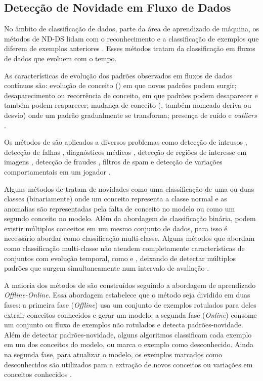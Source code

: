 \subsection{Detecção de Novidade em Fluxo de Dados}

No âmbito de classificação de dados, parte da área de aprendizado de máquina, os
métodos de \acf{ND-DS} lidam com o reconhecimento e a classificação de exemplos
que diferem de exemplos anteriores \cite{Markou2003,Perner2009,Gama2010}.
Esses métodos tratam da classificação em fluxos de dados que evoluem com o tempo.

As características de evolução dos padrões observados em fluxos de dados contínuos são: 
evolução de conceito (\evolution) em que novos padrões podem surgir;
desaparecimento ou recorrência de conceito, em que padrões podem desaparecer e
também podem reaparecer;
mudança de conceito (\drift, também nomeado deriva ou desvio) onde um padrão
gradualmente se transforma;
presença de ruído e \emph{outliers} \cite{Gama2010}.

Os métodos de \nd são aplicados a diversos problemas como
detecção de intrusos \cite{Coull2003,Spinosa2008,Viegas2019,Cassales2019a},
detecção de falhas \cite{Zhang2006},
diagnósticos médicos \cite{Perner2009},
detecção de regiões de interesse em imagens \cite{singh2004approach},
detecção de fraudes \cite{wang2003mining,Abdallah201690}, 
filtros de spam \cite{Hayat2010dct} e
detecção de variações comportamentais em um jogador \cite{Vallim20136258}.

Alguns métodos de \nd tratam de novidades como uma classificação de uma
ou duas classes (binariamente) onde um conceito representa a classe normal e as anomalias
são representadas pela falta de conceito no modelo ou como um segundo conceito
no modelo.
Além da abordagem de classificação binária, podem existir múltiplos conceitos em um mesmo
conjunto de dados, para isso é necessário abordar \nd como classificação
multi-classe.
Alguns métodos que abordam \nd como classificação multi-classe não
atendem completamente características de conjuntos com 
evolução temporal,
como \evolution e \drift, deixando de detectar múltiplos padrões que surgem
simultaneamente num intervalo de avaliação \cite{Faria2016ndds,Gama2010}.

A maioria dos métodos de \nd são construídos seguindo a abordagem de aprendizado
\emph{Offline-Online}. Essa abordagem estabelece que o método seja dividido em
duas fases:
a primeira fase (\emph{Offline}) usa um conjunto de exemplos rotulados para
deles extrair conceitos conhecidos e gerar um modelo;
a segunda fase (\emph{Online}) consome um conjunto ou fluxo de exemplos não
rotulados e detecta padrões-novidade.
Além de detectar padrões-novidade, alguns algoritmos classificam cada exemplo
em um dos conceitos do modelo, ou marca o exemplo como desconhecido.
Ainda na segunda fase, para atualizar o modelo, os exemplos marcados como
desconhecidos são utilizados para a extração de novos conceitos ou variações em
conceitos conhecidos \cite{Gama2010}.

